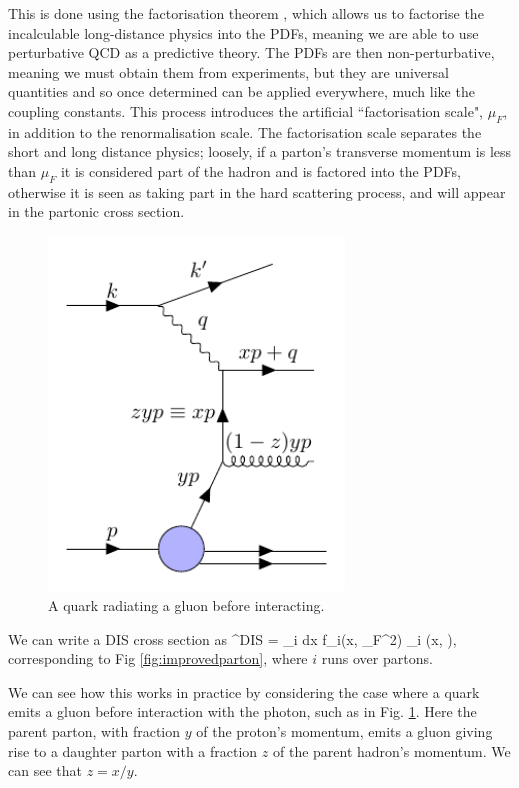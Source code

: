 This is done using the factorisation theorem \cite{Collins:1989gx}, which allows us to factorise the incalculable long-distance physics into the PDFs, meaning we are able to use perturbative QCD as a predictive theory. The PDFs are then non-perturbative, meaning we must obtain them from experiments, but they are universal quantities and so once determined can be applied everywhere, much like the coupling constants. This process introduces the artificial ``factorisation scale", $\mu_F$, in addition to the renormalisation scale. The factorisation scale separates the short and long distance physics; loosely, if a parton's transverse momentum is less than $\mu_F$ it is considered part of the hadron and is factored into the PDFs, otherwise it is seen as taking part in the hard scattering process, and will appear in the partonic cross section.


\begin{figure}[H]
\centering
\includegraphics[width=0.7\textwidth]{../diagrams/scalingviolation.pdf}
\caption{\label{fig:scalingviolation} A quark radiating a gluon before interacting.}
\end{figure}

We can write a DIS cross section as
\be
\label{eqn:disfact}
\sigma^{DIS} = \sum_i \int dx f_i(x, \mu_F^2) \hat{\sigma}_i \bigg(x,  \bigg),
\ee
corresponding to Fig \ref{fig:improvedparton}, where $i$ runs over partons.

We can see how this works in practice by considering the case where a quark emits a gluon before interaction with the photon, such as in Fig. \ref{fig:scalingviolation}. Here the parent parton, with fraction $y$ of the proton's momentum, emits a gluon giving rise to a daughter parton with a fraction $z$ of the parent hadron's momentum. We can see that $z = x/y$.


